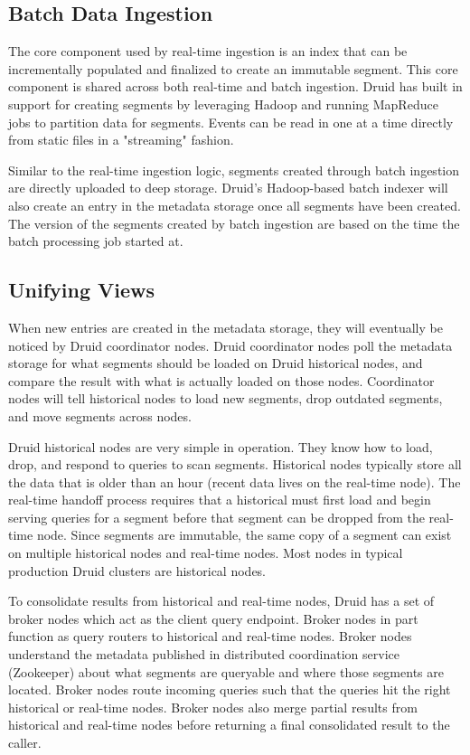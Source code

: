 \documentclass{vldb}
\begin{document}
\subsection{Batch Data Ingestion}
The core component used by real-time ingestion is an index that can be
incrementally populated and finalized to create an immutable segment. This core
component is shared across both real-time and batch ingestion. Druid has built
in support for creating segments by leveraging Hadoop and running MapReduce
jobs to partition data for segments.  Events can be read in one at a time
directly from static files in a "streaming" fashion.

Similar to the real-time ingestion logic, segments created through batch
ingestion are directly uploaded to deep storage. Druid’s Hadoop-based batch
indexer will also create an entry in the metadata storage once all segments
have been created. The version of the segments created by batch ingestion are
based on the time the batch processing job started at.

\subsection{Unifying Views}
When new entries are created in the metadata storage, they will eventually be
noticed by Druid coordinator nodes. Druid coordinator nodes poll the metadata
storage for what segments should be loaded on Druid historical nodes, and
compare the result with what is actually loaded on those nodes. Coordinator
nodes will tell historical nodes to load new segments, drop outdated segments,
and move segments across nodes.

Druid historical nodes are very simple in operation. They know how to load,
drop, and respond to queries to scan segments. Historical nodes typically
store all the data that is older than an hour (recent data lives on the
real-time node). The real-time handoff process requires that a historical must
first load and begin serving queries for a segment before that segment can
be dropped from the real-time node. Since segments are immutable, the same copy
of a segment can exist on multiple historical nodes and real-time nodes. Most
nodes in typical production Druid clusters are historical nodes.

To consolidate results from historical and real-time nodes, Druid has a set of
broker nodes which act as the client query endpoint. Broker nodes in part
function as query routers to historical and real-time nodes. Broker nodes
understand the metadata published in distributed coordination service
(Zookeeper) about what segments are queryable and where those segments are
located. Broker nodes route incoming queries such that the queries hit the
right historical or real-time nodes.  Broker nodes also merge partial results
from historical and real-time nodes before returning a final consolidated
result to the caller.
\end{document}
